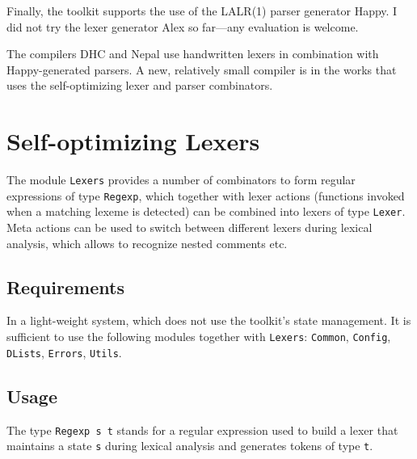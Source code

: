 \documentclass{report}
\newcommand{\code}[1]{\texttt{#1}}
\begin{document}
Finally, the toolkit supports the use of the LALR(1) parser generator Happy.
I did not try the lexer generator Alex so far---any evaluation is welcome.

The compilers DHC and Nepal use handwritten lexers in combination with
Happy-generated parsers.  A new, relatively small compiler is in the works
that uses the self-optimizing lexer and parser combinators.


\section{Self-optimizing Lexers}

The module \code{Lexers} provides a number of combinators to form regular
expressions of type \code{Regexp}, which together with lexer actions
(functions invoked when a matching lexeme is detected) can be combined into
lexers of type \code{Lexer}.  Meta actions can be used to switch between
different lexers during lexical analysis, which allows to recognize nested
comments etc.

\subsection{Requirements}

In a light-weight system, which does not use the toolkit's state management.
It is sufficient to use the following modules together with \code{Lexers}:
\code{Common}, \code{Config}, \code{DLists}, \code{Errors}, \code{Utils}.

\subsection{Usage}

The type \code{Regexp s t} stands for a regular expression used to build a
lexer that maintains a state \code{s} during lexical analysis and generates
tokens of type \code{t}.
\end{document}
